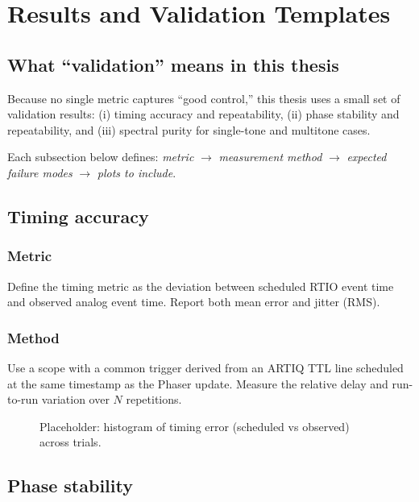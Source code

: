 \chapter{Results and Validation Templates}
\label{ch:results_validation}

\section{What “validation” means in this thesis}
Because no single metric captures “good control,” this thesis uses a small set of validation results:
(i) timing accuracy and repeatability, (ii) phase stability and repeatability, and (iii) spectral purity for single-tone
and multitone cases.

Each subsection below defines:
\emph{metric} $\rightarrow$ \emph{measurement method} $\rightarrow$ \emph{expected failure modes} $\rightarrow$ \emph{plots to include}.

\section{Timing accuracy}
\subsection{Metric}
Define the timing metric as the deviation between scheduled RTIO event time and observed analog event time.
Report both mean error and jitter (RMS).

\subsection{Method}
Use a scope with a common trigger derived from an ARTIQ TTL line scheduled at the same timestamp as the
Phaser update. Measure the relative delay and run-to-run variation over $N$ repetitions.

\begin{figure}[t]
  \centering
  \caption{Placeholder: histogram of timing error (scheduled vs observed) across trials.}
  \label{fig:result_timing_hist}
\end{figure}

\section{Phase stability}
